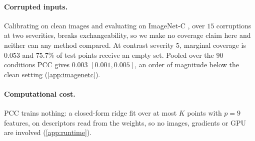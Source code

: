 \paragraph{Corrupted inputs.}
\label{sec:shift}
Calibrating on clean images and evaluating on ImageNet-C \cite{hendrycks2019benchmarking},
over $15$ corruptions at two severities, breaks exchangeability, so we make no coverage claim
here and neither can any method compared. At contrast severity $5$, marginal coverage is
$0.053$ and $75.7\%$ of test points receive an empty set. Pooled over the $90$ conditions PCC
gives $0.003$ $[0.001,0.005]$, an order of magnitude below the clean setting
(\cref{app:imagenetc}).

\paragraph{Computational cost.} PCC trains nothing: a closed-form ridge fit over at most $K$
points with $p=9$ features, on descriptors read from the weights, so no images, gradients or
GPU are involved (\cref{app:runtime}).
